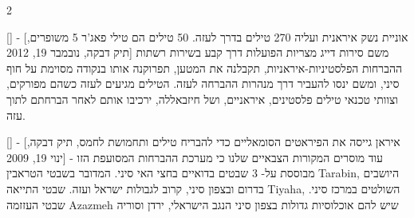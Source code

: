 \documentclass[10pt,a4paper,twoside]{article} %
\begin{document}
\begin{multicols}{2}
{[] - [אוניית נשק איראנית ועליה 270 טילים בדרך לעזה. 50 טילים הם טילי פאג'ר 5 משופרים, תיק דבקה, נובמבר 19, 2012]
משם סירות דייג מצריות הפועלות דרך קבע בשירות רשתות ההברחות הפלסטיניות-איראניות, תקבלנה את המטען, תפרוקנה אותו בנקודה מסוימת על חוף סיני, ומשם ינסו להעביר דרך מנהרות ההברחה לעזה. הטילים מגיעים לעזה כשהם מפורקים, וצוותי טכנאי טילים פלסטינים, איראניים, ושל חיזבאללה, ירכיבו אותם לאחר הברחתם לתוך עזה. 

[] - [איראן גייסה את הפיראטים הסומאליים כדי להבריח טילים ותחמושת לחמס, תיק דבקה, ינוי 19, 2009]
- עוד מוסרים המקורות הצבאיים שלנו כי מערכת ההברחות המסועפת הזו מבוססת על- 3 שבטים בדואיים בחצי האי סיני. המדובר בשבטי הטראבין Tarabin, היושבים בדרום ובצפון סיני, קרוב לגבולות ישראל ועזה. שבטי התייאה Tiyaha, השולטים במרכז סיני. שבטי העזזמה Azazmeh שיש להם אוכלוסיות גדולות בצפון סיני הנגב הישראלי, ירדן וסוריה
% 

}



\end{multicols}
\end{document}
